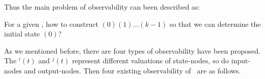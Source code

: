  Thus the main problem of observability can been described as: 
\begin{problem}
\label{pro:1}
For a given  \BCN, how to construct \Input$(0)$\Input$(1)\ldots$\Input$(k-1)$ so that we can determine the initial state \State$(0)$?
\end{problem}

As we mentioned before, there are four types of observability have been proposed. The \State$^{i}(t)$ and \State$^{j}(t)$ represent different valuations of state-nodes, so do input-nodes and output-nodes. Then four existing observability of \BCNs\ are as follows. 


